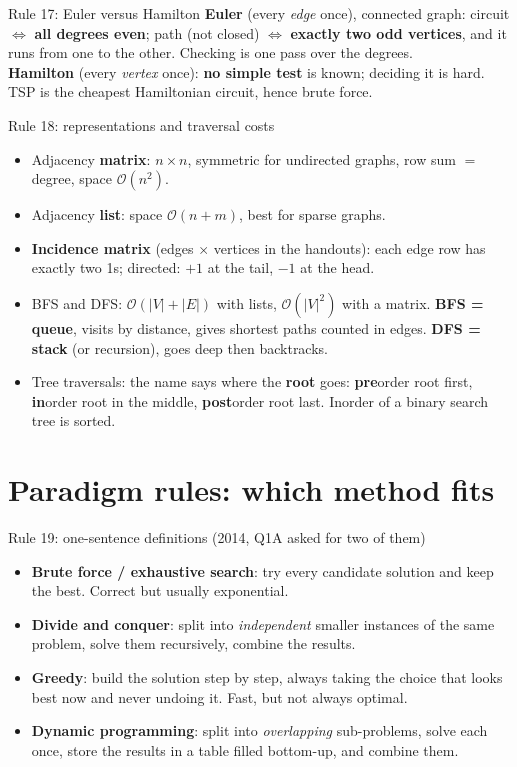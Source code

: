 \documentclass{fkt-notes}
\newcommand{\Oh}{\mathcal{O}}
\begin{document}
\begin{rulebox}{Rule 17: Euler versus Hamilton}
\textbf{Euler} (every \emph{edge} once), connected graph: circuit $\iff$ \textbf{all degrees even}; path (not closed) $\iff$ \textbf{exactly two odd vertices}, and it runs from one to the other. Checking is one pass over the degrees.\\
\textbf{Hamilton} (every \emph{vertex} once): \textbf{no simple test} is known; deciding it is hard. TSP is the cheapest Hamiltonian circuit, hence brute force.
\end{rulebox}

\begin{rulebox}{Rule 18: representations and traversal costs}
\begin{itemize}[leftmargin=1.5em,itemsep=1pt]
  \item Adjacency \textbf{matrix}: $n\times n$, symmetric for undirected graphs, row sum $=$ degree, space $\Oh(n^2)$.
  \item Adjacency \textbf{list}: space $\Oh(n+m)$, best for sparse graphs.
  \item \textbf{Incidence matrix} (edges $\times$ vertices in the handouts): each edge row has exactly two 1s; directed: $+1$ at the tail, $-1$ at the head.
  \item BFS and DFS: $\Oh(|V|+|E|)$ with lists, $\Oh(|V|^2)$ with a matrix. \textbf{BFS = queue}, visits by distance, gives shortest paths counted in edges. \textbf{DFS = stack} (or recursion), goes deep then backtracks.
  \item Tree traversals: the name says where the \textbf{root} goes: \textbf{pre}order root first, \textbf{in}order root in the middle, \textbf{post}order root last. Inorder of a binary search tree is sorted.
\end{itemize}
\end{rulebox}

\section{Paradigm rules: which method fits}
\label{sec:paradigms}

\begin{rulebox}{Rule 19: one-sentence definitions (2014, Q1A asked for two of them)}
\begin{itemize}[leftmargin=1.5em,itemsep=1pt]
  \item \textbf{Brute force / exhaustive search}: try every candidate solution and keep the best. Correct but usually exponential.
  \item \textbf{Divide and conquer}: split into \emph{independent} smaller instances of the same problem, solve them recursively, combine the results.
  \item \textbf{Greedy}: build the solution step by step, always taking the choice that looks best now and never undoing it. Fast, but not always optimal.
  \item \textbf{Dynamic programming}: split into \emph{overlapping} sub-problems, solve each once, store the results in a table filled bottom-up, and combine them.
\end{itemize}
\end{rulebox}
\end{document}
